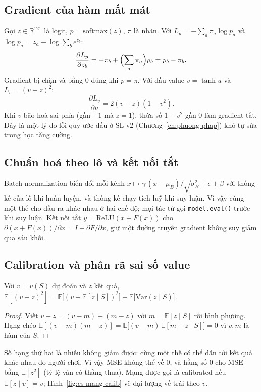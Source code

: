 \subsection{Gradient của hàm mất mát}
Gọi $z\in\mathbb R^{121}$ là logit, $p=\mathrm{softmax}(z)$, $\pi$ là nhãn. Với $L_p=-\sum_a\pi_a\log p_a$ và
$\log p_a=z_a-\log\sum_b e^{z_b}$:
\begin{equation}
  \frac{\partial L_p}{\partial z_b}=-\pi_b+\Bigl(\sum_a\pi_a\Bigr)p_b=p_b-\pi_b.
\end{equation}
Gradient bị chặn và bằng 0 đúng khi $p=\pi$. Với đầu value $v=\tanh u$ và $L_v=(v-z)^2$:
\begin{equation}
  \frac{\partial L_v}{\partial u}=2(v-z)(1-v^2).
\end{equation}
Khi $v$ bão hoà sai phía (gần $-1$ mà $z=1$), thừa số $1-v^2$ gần 0 làm gradient tắt. Đây là một lý do lỗi quy ước
dấu ở SL v2 (Chương~\ref{ch:phuong-phap}) khó tự sửa trong học tăng cường.

\subsection{Chuẩn hoá theo lô và kết nối tắt}
Batch normalization biến đổi mỗi kênh $x\mapsto\gamma\,(x-\mu_B)/\sqrt{\sigma_B^2+\epsilon}+\beta$ với thống kê
của lô khi huấn luyện, và thống kê chạy tích luỹ khi suy luận. Vì vậy cùng một thế cho đầu ra khác nhau ở hai chế
độ; mọi tác tử gọi \texttt{model.eval()} trước khi suy luận. Kết nối tắt $y=\mathrm{ReLU}(x+F(x))$ \cite{he2016resnet}
cho $\partial(x+F(x))/\partial x=I+\partial F/\partial x$, giữ một đường truyền gradient không suy giảm qua sáu khối.

\subsection{Calibration và phân rã sai số value}
\begin{dinhly}
\label{dl:cs-mse}
Với $v=v(S)$ dự đoán và $z$ kết quả,
$\mathbb E[(v-z)^2]=\mathbb E\bigl[(v-\mathbb E[z\mid S])^2\bigr]+\mathbb E\bigl[\mathrm{Var}(z\mid S)\bigr]$.
\end{dinhly}
\begin{proof}
Viết $v-z=(v-m)+(m-z)$ với $m=\mathbb E[z\mid S]$ rồi bình phương. Hạng chéo
$\mathbb E[(v-m)(m-z)]=\mathbb E\bigl[(v-m)\,\mathbb E[m-z\mid S]\bigr]=0$ vì $v,m$ là hàm của $S$.
\end{proof}
Số hạng thứ hai là nhiễu không giảm được: cùng một thế có thể dẫn tới kết quả khác nhau do người chơi. Vì vậy MSE
không thể về 0, và hằng số 0 cho MSE bằng $\mathbb E[z^2]$ (tỷ lệ ván có thắng thua). Mạng được gọi là calibrated
nếu $\mathbb E[z\mid v]=v$; Hình~\ref{fig:cs-mang-calib} vẽ đại lượng vế trái theo $v$.

